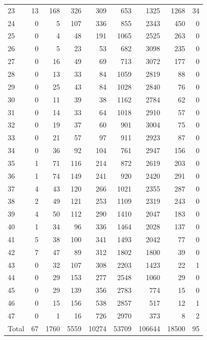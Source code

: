\begin{table}
\begin{tabular}{lrrrrrrrr}
23 & 13 & 168 & 326 & 309 & 653 & 1325 & 1268 & 34 \\
24 & 0 & 5 & 107 & 336 & 855 & 2343 & 450 & 0 \\
25 & 0 & 4 & 48 & 191 & 1065 & 2525 & 263 & 0 \\
26 & 0 & 5 & 23 & 53 & 682 & 3098 & 235 & 0 \\
27 & 0 & 16 & 49 & 69 & 713 & 3072 & 177 & 0 \\
28 & 0 & 13 & 33 & 84 & 1059 & 2819 & 88 & 0 \\
29 & 0 & 25 & 43 & 84 & 1028 & 2840 & 76 & 0 \\
30 & 0 & 11 & 39 & 38 & 1162 & 2784 & 62 & 0 \\
31 & 0 & 14 & 33 & 64 & 1018 & 2910 & 57 & 0 \\
32 & 0 & 19 & 37 & 60 & 901 & 3004 & 75 & 0 \\
33 & 0 & 21 & 57 & 97 & 911 & 2923 & 87 & 0 \\
34 & 0 & 36 & 92 & 104 & 761 & 2947 & 156 & 0 \\
35 & 1 & 71 & 116 & 214 & 872 & 2619 & 203 & 0 \\
36 & 1 & 74 & 149 & 241 & 920 & 2420 & 291 & 0 \\
37 & 4 & 43 & 120 & 266 & 1021 & 2355 & 287 & 0 \\
38 & 2 & 49 & 121 & 253 & 1109 & 2319 & 243 & 0 \\
39 & 4 & 50 & 112 & 290 & 1410 & 2047 & 183 & 0 \\
40 & 1 & 34 & 96 & 336 & 1464 & 2028 & 137 & 0 \\
41 & 5 & 38 & 100 & 341 & 1493 & 2042 & 77 & 0 \\
42 & 7 & 47 & 89 & 312 & 1802 & 1800 & 39 & 0 \\
43 & 0 & 32 & 107 & 308 & 2203 & 1423 & 22 & 1 \\
44 & 0 & 29 & 153 & 277 & 2548 & 1060 & 29 & 0 \\
45 & 0 & 29 & 139 & 356 & 2783 & 774 & 15 & 0 \\
46 & 0 & 15 & 156 & 538 & 2857 & 517 & 12 & 1 \\
47 & 0 & 1 & 16 & 726 & 2970 & 373 & 8 & 2 \\
Total & 67 & 1760 & 5559 & 10274 & 53709 & 106644 & 18500 & 95 \\
\end{tabular}
\end{table}
